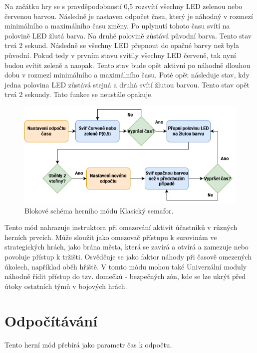 Na začátku hry se s pravděpodobností 0,5 rozsvítí všechny LED zelenou nebo červenou barvou. Následně je nastaven odpočet času, který je náhodný v rozmezí minimálního a maximálního času změny. 
Po uplynutí tohoto času svítí na polovině LED žlutá barva. Na druhé polovině zůstává původní barva. Tento stav trvá 2 sekund. Následně se všechny LED přepnout do opačné barvy než byla původní. 
Pokud tedy v prvním stavu svítily všechny LED červeně, tak nyní budou svítit zeleně a naopak. Tento stav bude opět aktivní po náhodně dlouhou dobu v rozmezí minimálního a maximálního času. Poté 
opět následuje stav, kdy jedna polovina LED zůstává stejná a druhá svítí žlutou barvou. Tento stav opět trvá 2 sekundy. Tato funkce se neustále opakuje. 

\begin{figure}[!h]
  \begin{center}
    \includegraphics[scale=0.7]{obrazky/Klasicky_semafor_diagram.png}
  \end{center}
  \caption[Blokové schéma herního módu Klasický semafor]{Blokové schéma herního módu Klasický semafor.}
\end{figure}

Tento mód nahrazuje instruktora při omezování aktivit účastníků v různých herních prvcích. Může sloužit jako omezovač přístupu k surovinám ve strategických hrách, jako brána města, která se zavírá 
a otvírá a zamezuje nebo povoluje přístup k tržišti. Osvědčuje se jako faktor náhody při časově omezených úkolech, například oběh hřiště. V tomto módu mohou také Univerzální moduly náhodně řídit 
přístup do tzv. domečků - bezpečných zón, kde se lze ukrýt před útoky ostatních týmů v bojových hrách.

\section{Odpočítávání}
Tento herní mód přebírá jako parametr čas k odpočtu.

